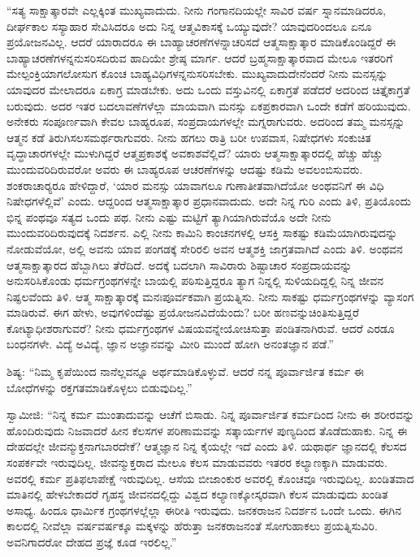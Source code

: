 \vskip 2pt

 “ಸತ್ಯ ಸಾಕ್ಷಾತ್ಕಾರವೇ ಎಲ್ಲಕ್ಕಿಂತ ಮುಖ್ಯವಾದುದು. ನೀನು ಗಂಗಾನದಿಯಲ್ಲೇ ಸಾವಿರ ವರ್ಷ ಸ್ನಾನಮಾಡಿದರೂ, ದೀರ್ಘಕಾಲ ಸಸ್ಯಾಹಾರ ಸೇವಿಸಿದರೂ ಅದು ನಿನ್ನ ಆತ್ಮವಿಕಾಸಕ್ಕೆ ಒಯ್ಯುವುದೇ? ಯಾವುದರಿಂದಲೂ ಏನೂ ಪ್ರಯೋಜನವಿಲ್ಲ. ಆದರೆ ಯಾರಾದರೂ ಈ ಬಾಹ್ಯಾಚರಣೆಗಳನ್ನಾಚರಿಸದೆ ಆತ್ಮಸಾಕ್ಷಾತ್ಕಾರ ಮಾಡಿಕೊಂಡಿದ್ದರೆ ಈ ಬಾಹ್ಯಾಚರಣೆಗಳನ್ನನುಸರಿಸದಿರುವ ಹಾದಿಯೇ ಶ್ರೇಷ್ಠ ಮಾರ್ಗ. ಆದರೆ ಬ್ರಹ್ಮಸಾಕ್ಷಾತ್ಕಾರವಾದ ಮೇಲೂ ಇತರರಿಗೆ ಮೇಲ್ಪಂಕ್ತಿಯಾಗಲೋಸುಗ ಕೊಂಚ ಬಾಹ್ಯವಿಧಿಗಳನ್ನನುಸರಿಸಬೇಕು. ಮುಖ್ಯವಾದುದೇನೆಂದರೆ ನೀನು ಮನಸ್ಸನ್ನು ಯಾವುದರ ಮೇಲಾದರೂ ಏಕಾಗ್ರ ಮಾಡಬೇಕು. ಅದು ಒಂದು ವಸ್ತುವಿನಲ್ಲಿ ಏಕಾಗ್ರತೆ ಪಡೆದರೆ ಅದರಿಂದ ಚಿತ್ತೈಕಾಗ್ರತೆ ಬರುವುದು. ಅದರ ಇತರ ಬದಲಾವಣೆಗಳೆಲ್ಲಾ ಮಾಯವಾಗಿ ಮನಸ್ಸು ಏಕಪ್ರಕಾರವಾಗಿ ಒಂದೇ ಕಡೆಗೆ ಹರಿಯುವುದು. ಅನೇಕರು ಸಂಪೂರ್ಣವಾಗಿ ಕೇವಲ ಬಾಹ್ಯರೂಪ, ಸಂಪ್ರದಾಯಗಳಲ್ಲೇ ಮಗ್ನರಾಗುವರು. ಅದರಿಂದ ತಮ್ಮ ಮನಸ್ಸನ್ನು ಆತ್ಮನ ಕಡೆ ತಿರುಗಿಸಲಸಮರ್ಥರಾಗುವರು. ನೀನು ಹಗಲು ರಾತ್ರಿ ಬರೀ ಉಪವಾಸ, ನಿಷೇಧಗಳು ಸಂಕುಚಿತ ವೃದ್ಧಾಚಾರಗಳಲ್ಲೇ ಮುಳುಗಿದ್ದರೆ ಆತ್ಮಪ್ರಕಾಶಕ್ಕೆ ಅವಕಾಶವೆಲ್ಲಿದೆ? ಯಾರು ಆತ್ಮಸಾಕ್ಷಾತ್ಕಾರದಲ್ಲಿ ಹೆಚ್ಚು ಹೆಚ್ಚು ಮುಂದುವರಿದಿರುವರೋ ಅವರು ಈ ಬಾಹ್ಯರೂಪ ಆಚರಣೆಗಳನ್ನು ಆದಷ್ಟು ಕಡಿಮೆ ಅವಲಂಬಿಸುವರು. ಶಂಕರಾಚಾರ‍್ಯರೂ‌ ಹೇಳಿದ್ದಾರೆ, ‘ಯಾರ ಮನಸ್ಸು ಯಾವಾಗಲೂ ಗುಣಾತೀತವಾಗಿದೆಯೋ ಅಂಥವನಿಗೆ ಈ ವಿಧಿ ನಿಷೇಧಗಳೆಲ್ಲಿವೆ’ ಎಂದು. ಆದ್ದರಿಂದ ಆತ್ಮಸಾಕ್ಷಾತ್ಕಾರ ಪ್ರಧಾನವಾದುದು. ಅದೇ ನಿನ್ನ ಗುರಿ ಎಂದು ತಿಳಿ, ಪ್ರತಿಯೊಂದು ಭಿನ್ನ ಪಂಥವೂ ಸತ್ಯದ ಒಂದು ಪಥ. ನೀನು ಎಷ್ಟು ಮಟ್ಟಿಗೆ ತ್ಯಾಗಿಯಾಗಿರುವೆಯೊ ಅದೇ ನೀನು ಮುಂದುವರಿದಿರುವುದಕ್ಕೆ ನಿದರ್ಶನ. ಎಲ್ಲಿ ನೀನು ಕಾಮಿನಿ ಕಾಂಚನಗಳಲ್ಲಿ ಆಸಕ್ತಿ ಸಾಕಷ್ಟು ಕಡಿಮೆಯಾಗಿರುವುದನ್ನು ನೋಡುವೆಯೋ, ಅಲ್ಲಿ ಅವನು ಯಾವ ಪಂಗಡಕ್ಕೆ ಸೇರಿರಲಿ ಅವನ ಆತ್ಮಶಕ್ತಿ ಜಾಗ್ರತವಾಗಿದೆ ಎಂದು ತಿಳಿ. ಅಂಥವನ ಆತ್ಮಸಾಕ್ಷಾತ್ಕಾರದ ಹೆಬ್ಬಾಗಿಲು ತೆರೆದಿದೆ. ಅದಕ್ಕೆ ಬದಲಾಗಿ ಸಾವಿರಾರು ಶಿಷ್ಟಾಚಾರ ಸಂಪ್ರದಾಯವನ್ನು ಅನುಸರಿಸಿಕೊಂಡು ಧರ್ಮಗ್ರಂಥಗಳನ್ನೇ ಬಾಯಲ್ಲಿ ಪಠಿಸುತ್ತಿದ್ದರೂ ತ್ಯಾಗ ನಿನ್ನಲ್ಲಿ ಸುಳಿಯದಿದ್ದಲ್ಲಿ ನಿನ್ನ ಜೀವನ ನಿಷ್ಫಲವೆಂದು ತಿಳಿ. ಆತ್ಮ ಸಾಕ್ಷಾತ್ಕಾರಕ್ಕೆ ಮನಃಪೂರ್ವಕವಾಗಿ ಪ್ರಯತ್ನಿಸು. ನೀನು ಸಾಕಷ್ಟು ಧರ್ಮಗ್ರಂಥಗಳನ್ನು ವ್ಯಾಸಂಗ ಮಾಡಿರುವೆ. ಈಗ ಹೇಳು, ಅವುಗಳಿಂದೆಷ್ಟು ಪ್ರಯೋಜನವಿದೆಯೆಂದು? ಬರೀ ಹಣವನ್ನು\break ಚಿಂತಿಸುತ್ತಿದ್ದರೆ ಕೋಟ್ಯಾಧೀಶರಾಗುವರೆ? ನೀನು ಧರ್ಮಗ್ರಂಥಗಳ ವಿಷಯವನ್ನೇ\break ಯೋಚಿಸುತ್ತಾ ಪಂಡಿತನಾಗಿರುವೆ. ಆದರೆ ಎರಡೂ ಬಂಧನಗಳೇ. ವಿದ್ಯೆ ಅವಿದ್ಯೆ, ಜ್ಞಾನ ಅಜ್ಞಾನವನ್ನು ಮೀರಿ ಮುಂದೆ ಹೋಗಿ ಅನಂತಜ್ಞಾನ ಪಡೆ.” 

 ಶಿಷ್ಯ: “ನಿಮ್ಮ ಕೃಪೆಯಿಂದ ನಾನೆಲ್ಲವನ್ನೂ ಅರ್ಥಮಾಡಿಕೊಳ್ಳುವೆ. ಆದರೆ ನನ್ನ ಪೂರ್ವಾರ್ಜಿತ ಕರ್ಮ ಈ ಬೋಧೆಗಳನ್ನು ರಕ್ತಗತಮಾಡಿಕೊಳ್ಳಲು ಬಿಡುವುದಿಲ್ಲ.” 

 ಸ್ವಾಮೀಜಿ: “ನಿನ್ನ ಕರ್ಮ ಮುಂತಾದುವನ್ನು ಆಚೆಗೆ ಬಿಸಾಡು. ನಿನ್ನ ಪೂರ್ವಾರ್ಜಿತ ಕರ್ಮದಿಂದ ನೀನು ಈ ಶರೀರವನ್ನು ಹೊಂದಿರುವುದು ನಿಜವಾದರೆ ಹೀನ ಕೆಲಸಗಳ ಪರಿಣಾಮವನ್ನು ಸತ್ಕಾರ್ಯಗಳ ಪುಣ್ಯದಿಂದ ತೊಡೆದುಹಾಕು. ನಿನ್ನ ಈ ದೇಹದಲ್ಲೇ ಜೀವನ್ಮುಕ್ತನಾಗಬಾರದೇಕೆ? ಆತ್ಮಜ್ಞಾನ ನಿನ್ನ ಕೈಯಲ್ಲೇ ಇದೆ ಎಂದು ತಿಳಿ. ಯಥಾರ್ಥ ಜ್ಞಾನದಲ್ಲಿ ಕೆಲಸದ ಸಂಪರ್ಕವೇ ಇರುವುದಿಲ್ಲ. ಜೀವನ್ಮುಕ್ತರಾದ ಮೇಲೂ ಕೆಲಸ ಮಾಡುವವರು ಇತರರ ಕಲ್ಯಾಣಕ್ಕಾಗಿ ಮಾಡುವರು. ಅವರಲ್ಲಿ ಕರ್ಮ ಪ್ರತಿಫಲಾಪೇಕ್ಷೆ ಇರುವುದಿಲ್ಲ. ಆಸೆಯ ಬೀಜಾಂಕುರ ಅವರಲ್ಲಿ ಕೊಂಚವೂ ಇರುವುದಿಲ್ಲ. ಖಂಡಿತವಾದ ಮಾತಿನಲ್ಲಿ ಹೇಳಬೇಕಾದರೆ ಗೃಹಸ್ಥ ಜೀವನದಲ್ಲಿದ್ದು ವಿಶ್ವದ ಕಲ್ಯಾಣಕ್ಕೋಸ್ಕರವಾಗಿ ಕೆಲಸ ಮಾಡುವುದು ಖಂಡಿತ ಅಸಾಧ್ಯ. ಹಿಂದೂ ಧಾರ್ಮಿಕ ಗ್ರಂಥಗಳಲ್ಲೆಲ್ಲಾ ಈ‌ರೀತಿ ಇರುವುದು. ಜನಕರಾಜನ ನಿದರ್ಶನ ಒಂದೇ ಒಂದು. ಈಗಿನ ಕಾಲದಲ್ಲಿ ನೀವೆಲ್ಲಾ ವರ್ಷವರ್ಷಕ್ಕೂ ಮಕ್ಕಳನ್ನು ಹೆರುತ್ತಾ ಜನಕರಾಜನಂತೆ ಸೋಗುಹಾಕಲು ಪ್ರಯತ್ನಿಸುವಿರಿ. ಅವನಿಗಾದರೋ ದೇಹದ ಪ್ರಜ್ಞೆ ಕೂಡ ಇರಲಿಲ್ಲ.” 

